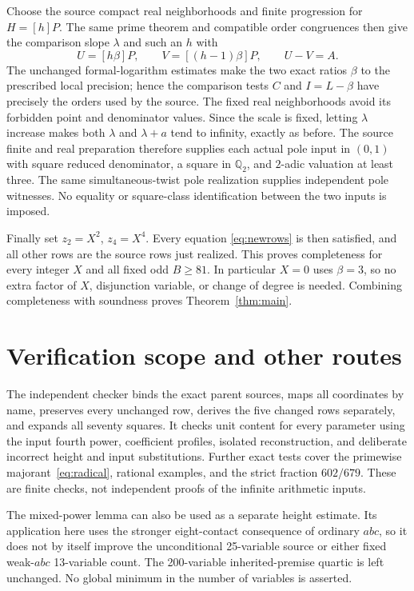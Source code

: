\documentclass[11pt,a4paper]{article}
\theoremstyle{remark}\newtheorem{remark}[theorem]{Remark}
\newcommand{\Q}{\mathbb Q}\newcommand{\Z}{\mathbb Z}
\begin{document}
Choose the source compact real neighborhoods and finite progression for
$H=[h]P$. The same prime theorem and compatible order congruences then
give the comparison slope $\lambda$ and such an $h$ with
\[
 U=[h\beta]P,\qquad V=[(h-1)\beta]P,
 \qquad U-V=A.
\]
The unchanged formal-logarithm estimates make the two exact ratios
$\beta$ to the prescribed local precision; hence the comparison tests
$C$ and $I=L-\beta$ have precisely the orders used by the source.
The fixed real neighborhoods avoid its forbidden point and denominator
values. Since the scale is fixed, letting $\lambda$ increase makes
both $\lambda$ and $\lambda+a$ tend to infinity, exactly as before.
The source finite and real preparation therefore supplies each actual
pole input in $(0,1)$ with square reduced denominator, a square in
$\Q_2$, and $2$-adic valuation at least three. The same simultaneous-twist
pole realization supplies independent pole witnesses. No equality or
square-class identification between the two inputs is imposed.

Finally set $z_2=X^2$, $z_4=X^4$. Every equation
\eqref{eq:newrows} is then satisfied, and all other rows are the source
rows just realized. This proves completeness for every integer $X$ and
all fixed odd $B\ge81$. In particular $X=0$ uses $\beta=3$, so no extra
factor of $X$, disjunction variable, or change of degree is needed.
Combining completeness with soundness proves Theorem~\ref{thm:main}.

\section{Verification scope and other routes}
The independent checker binds the exact parent sources, maps all
coordinates by name, preserves every unchanged row, derives the five
changed rows separately, and expands all seventy squares. It checks
unit content for every parameter using the input fourth power,
coefficient profiles, isolated reconstruction, and deliberate incorrect
height and input substitutions. Further exact tests cover the primewise
majorant~\eqref{eq:radical}, rational examples, and the strict fraction
$602/679$. These are finite checks, not independent proofs of the
infinite arithmetic inputs.

The mixed-power lemma can also be used as a separate height estimate.
Its application here uses the stronger eight-contact consequence of
ordinary $abc$, so it does not by itself improve the unconditional
25-variable source or either fixed weak-$abc$ 13-variable count.
The 200-variable inherited-premise quartic is left unchanged. No global
minimum in the number of variables is asserted.
\end{document}
